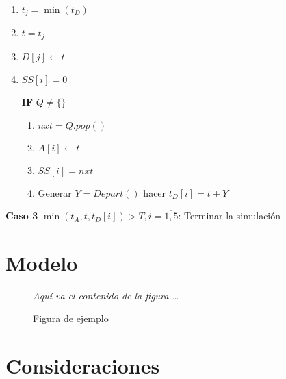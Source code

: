 \documentclass[a4paper,10pt,twocolumn]{article}
\begin{document}
		\begin{enumerate}
			\item[] $t_{j} = \min(t_{D})$
			\item[] $t = t_{j}$
			\item[] $D[j] \leftarrow t$
			\item[] $SS[i] = 0$
			
			\textbf{IF} $Q \neq \{\}$
				\begin{enumerate}
					\item[] $nxt = Q.pop()$
					\item[] $A[i] \leftarrow t$
					\item[] $SS[i] = nxt$
					\item[] Generar $Y = Depart()$ hacer $t_{D}[i] = t + Y$ 
				\end{enumerate} 
		\end{enumerate}
		
		\textbf{Caso 3} $ \min{( t_{A}, t, t_{D}[i] )} > T, i = \overline{1,5}$: Terminar la simulaci\'on
		
\section{Modelo}\label{sub:listings}

		\begin{figure}[htb]%
			\begin{center}
				\emph{Aquí va el contenido de la figura \ldots}
			\end{center}
			\caption{Figura de ejemplo \label{fig:ex}}%
		\end{figure}

\section{Consideraciones}




\end{document}

